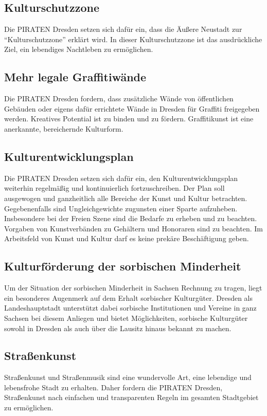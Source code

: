 \documentclass[a4paper, 11pt]{article}
\begin{document}
\subsection{Kulturschutzzone}
Die PIRATEN Dresden setzen sich dafür ein, dass die Äußere Neustadt zur ``Kulturschutzzone'' erklärt wird. In dieser Kulturschutzzone ist das ausdrückliche Ziel, ein lebendiges Nachtleben zu ermöglichen.


\subsection{Mehr legale Graffitiwände}
Die PIRATEN Dresden fordern, dass zusätzliche Wände von öffentlichen Gebäuden oder eigens dafür errichtete Wände in Dresden für Graffiti freigegeben werden. Kreatives Potential ist zu binden und zu fördern. Graffitikunst ist eine anerkannte, bereichernde Kulturform.


\subsection{Kulturentwicklungsplan}
Die PIRATEN Dresden setzen sich dafür ein, den Kulturentwicklungsplan weiterhin regelmäßig und kontinuierlich fortzuschreiben. Der Plan soll ausgewogen und ganzheitlich alle Bereiche der Kunst und Kultur betrachten. Gegebenenfalls sind Ungleichgewichte zugunsten einer Sparte aufzuheben. Insbesondere bei der Freien Szene sind die Bedarfe zu erheben und zu beachten. Vorgaben von Kunstverbänden zu Gehältern und Honoraren sind zu beachten. Im Arbeitsfeld von Kunst und Kultur darf es keine prekäre Beschäftigung geben.



\subsection{Kulturförderung der sorbischen Minderheit}
Um der Situation der sorbischen Minderheit in Sachsen Rechnung zu tragen, liegt ein besonderes Augenmerk auf dem Erhalt sorbischer Kulturgüter. Dresden als Landeshauptstadt unterstützt dabei sorbische Institutionen und Vereine in ganz Sachsen bei diesem Anliegen und bietet Möglichkeiten, sorbische Kulturgüter sowohl in Dresden als auch über die Lausitz hinaus bekannt zu machen.


\subsection{Straßenkunst}
Straßenkunst und Straßenmusik sind eine wundervolle Art, eine lebendige und lebensfrohe Stadt zu erhalten. Daher fordern die PIRATEN Dresden, Straßenkunst nach einfachen und transparenten Regeln im gesamten Stadtgebiet zu ermöglichen.
\end{document}
